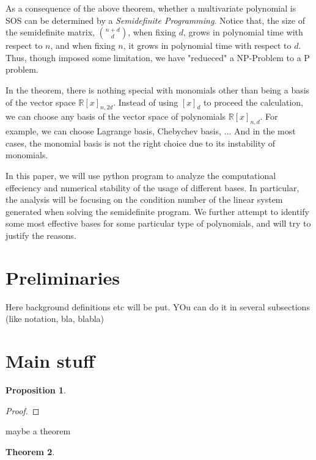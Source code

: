 \documentclass[12pt]{amsart}
\numberwithin{equation}{section}
\newtheorem{thm}{Theorem}
\newtheorem{prop}[thm]{Proposition}
\theoremstyle{definition}
\numberwithin{thm}{section}
\begin{document}
\cite{Blekherman:Parrilo:Thomas}

As a consequence of the above theorem, whether a multivariate polynomial is SOS can be determined 
by a \emph{Semidefinite Programming}. Notice that, the size of the semidefinite matrix,
${n+d \choose d}$, when fixing $d$, grows in polynomial time with respect to $n$, and when 
fixing $n$, it grows in polynomial time with respect to $d$. Thus, though imposed some 
limitation, we have "redueced" a NP-Problem to a P problem. 

In the theorem, there is nothing special with monomials other than being a basis of the vector space $\mathbb{R}[x]_{n,2d}$. 
Instead of using $[x]_d$ to proceed the calculation,
we can choose any basis of the vector space of polynomials $\mathbb{R}[x]_{n,d}$. 
For example, we can choose Lagrange basis, Chebychev basis, ... And in the most cases,
the monomial basis is not the right choice due to its instability of monomials.

In this paper, we will use python program to analyze the computational effeciency and 
numerical stability of the usage of different bases. In particular, the analysis will
be focusing on the condition number of the linear system generated when solving the 
semidefinite program. We further attempt to identify some most effective bases for some particular
type of polynomials, and will try to justify the reasons.  


\section{Preliminaries}
\label{Sec:Preliminaries}

Here background definitions etc will be put. 
YOu can do it in several subsections (like notation, bla, blabla)


\section{Main stuff}


\begin{prop}

\end{prop}

\begin{proof}

\end{proof}

maybe a theorem


\begin{thm}

\end{thm}
\end{document}
